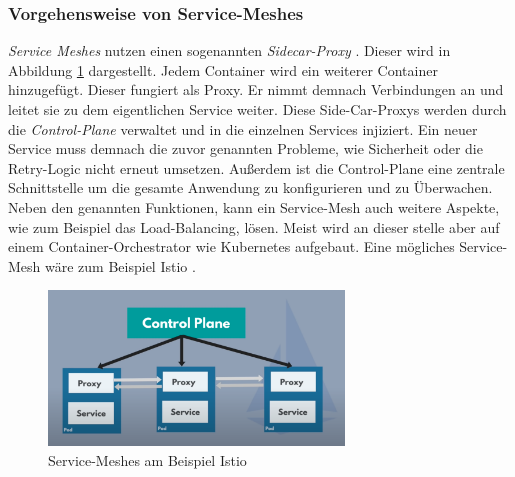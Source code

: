 \subsubsection{Vorgehensweise von Service-Meshes}
\textit{Service Meshes} nutzen einen sogenannten \textit{Sidecar-Proxy} \cite{codingwithnana_istio_nodate}. Dieser wird in Abbildung \ref{fig:service-mesh} dargestellt. Jedem Container wird ein weiterer Container hinzugefügt. Dieser fungiert als Proxy. Er nimmt demnach Verbindungen an und leitet sie zu dem eigentlichen Service weiter. Diese Side-Car-Proxys werden durch die \textit{Control-Plane} verwaltet und in die einzelnen Services injiziert. Ein neuer Service muss demnach die zuvor genannten Probleme, wie Sicherheit oder die Retry-Logic nicht erneut umsetzen. Außerdem ist die Control-Plane eine zentrale Schnittstelle um die gesamte Anwendung zu konfigurieren und zu Überwachen. Neben den genannten Funktionen, kann ein Service-Mesh auch weitere Aspekte, wie zum Beispiel das Load-Balancing, lösen. Meist wird an dieser stelle aber auf einem Container-Orchestrator wie Kubernetes \cite{kubernetes_production-grade_nodate} aufgebaut. Eine mögliches Service-Mesh wäre zum Beispiel Istio \cite{istio_istio_nodate}. 
\begin{figure}[bth] 
  \centering
  \includegraphics[width=0.7\textwidth]{Chapters/2-Grundlagen/Graphics/service-meshes.png}
  \caption{Service-Meshes am Beispiel Istio \cite{codingwithnana_istio_nodate}}
  \label{fig:service-mesh}
\end{figure}